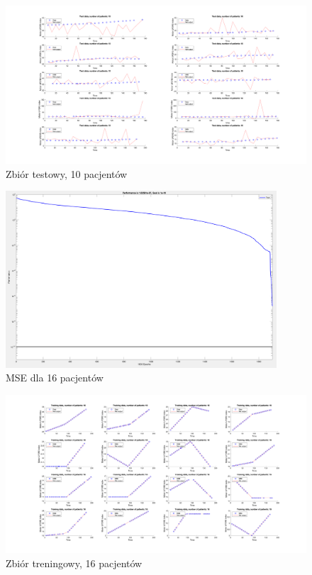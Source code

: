 \documentclass[12pt]{article}
\begin{document}
\begin{figure}[h!]

\centering
\includegraphics[width=1.1\textwidth]{test-normal-10.png}
\caption{Zbiór testowy, 10 pacjentów}

\end{figure}

\begin{figure}[h!]

\centering
\includegraphics[width=0.9\textwidth]{mse-normal-16.png}
\caption{MSE dla 16 pacjentów}

\end{figure}

\begin{figure}[h!]

\centering
\includegraphics[width=1.1\textwidth]{training-normal-16.png}
\caption{Zbiór treningowy, 16 pacjentów}

\end{figure}
\end{document}
